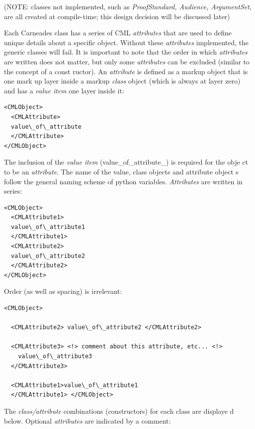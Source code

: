 \documentclass[10pt,a4paper,twocolumn]{article}
\begin{document}
(NOTE: classes not implemented, such as \textit{ProofStandard, Audience, ArgumentSet}, 
are all created at compile-time; this design decision will be discussed later)

Each Carneades class has a series of CML \textit{attributes} that are used to define 
unique details about a specific object. Without these \textit{attributes} 
implemented, the generic classes will fail. It is important to note that 
the order in which \textit{attributes} are written does not matter, but only 
some \textit{attributes} can be excluded (similar to the concept of a const
ructor). An \textit{attribute} is defined as a markup object that is one mark
up layer inside a markup \textit{class} object (which is always at layer zero) 
and has a \textit{value item} one layer inside it:

\begin{lstlisting}
<CMLObject>
  <CMLAttribute>
  value\_of\_attribute
  </CMLAttribute>
</CMLObject>
\end{lstlisting}

The inclusion of the \textit{value item} (value\_of\_attribute\_) is required for the obje
ct to be an \textit{attribute}. The name of the value, class objects and attribute object
s follow the general naming scheme of python variables. \textit{Attributes} are written in series:

\begin{lstlisting}
<CMLObject>
  <CMLAttribute1>
  value\_of\_attribute1
  </CMLAttribute1>
  <CMLAttribute2>
  value\_of\_attribute2
  </CMLAttribute2>
</CMLObject>
\end{lstlisting}

Order (as well as spacing) is irrelevant:

\begin{lstlisting}
<CMLObject>

  <CMLAttribute2> value\_of\_attribute2 </CMLAttribute2>

  <CMLAttribute3> <!> comment about this attribute, etc... <!>
    value\_of\_attribute3
  </CMLAttribute3>

  <CMLAttribute1>value\_of\_attribute1
  </CMLAttribute1> </CMLObject>
\end{lstlisting}

The \textit{class/attribute} combinations (constructors) for each class are displaye
d below. Optional \textit{attributes} are indicated by a comment:
\end{document}

